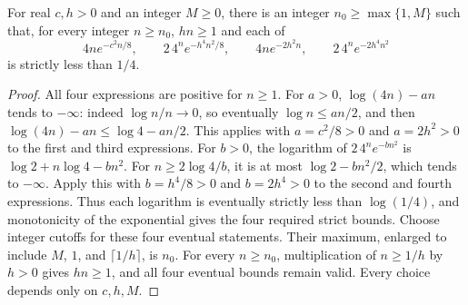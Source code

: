 \begin{lemma}
For real $c,h>0$ and an integer $M\geq0$, there is an integer
$n_0\geq\max\{1,M\}$ such that, for every integer $n\geq n_0$,
$hn\geq1$ and each of
\[
4n e^{-c^2n/8},\qquad 2\,4^n e^{-h^4n^2/8},\qquad
4n e^{-2h^2n},\qquad 2\,4^n e^{-2h^4n^2}
\]
is strictly less than $1/4$.
\end{lemma}
\begin{proof}
All four expressions are positive for $n\geq1$. For $a>0$,
$\log(4n)-an$ tends to $-\infty$: indeed
$\log n/n\to0$, so eventually $\log n\leq an/2$, and then
$\log(4n)-an\leq\log4-an/2$.
This applies with $a=c^2/8>0$ and $a=2h^2>0$ to the first and
third expressions. For $b>0$, the logarithm of
$2\,4^n e^{-bn^2}$ is $\log2+n\log4-bn^2$.
For $n\geq2\log4/b$, it is at most $\log2-bn^2/2$, which
tends to $-\infty$. Apply this with $b=h^4/8>0$ and
$b=2h^4>0$ to the second and fourth expressions. Thus each
logarithm is eventually strictly less than $\log(1/4)$, and
monotonicity of the exponential gives the four required strict bounds.
Choose integer cutoffs for these four eventual statements. Their
maximum, enlarged to include $M$, $1$, and $\lceil1/h\rceil$, is
$n_0$. For every $n\geq n_0$, multiplication of $n\geq1/h$ by
$h>0$ gives $hn\geq1$, and all four eventual bounds remain valid.
Every choice depends only on $c,h,M$.
\end{proof}
